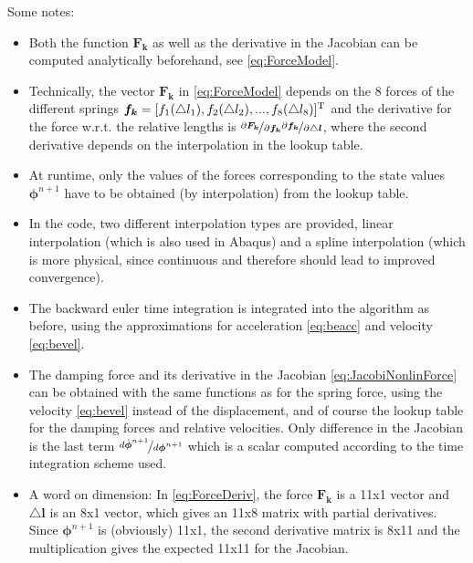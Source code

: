 Some notes:
\begin{itemize}
	\item Both the function $\boldsymbol{F_k}$ as well as the derivative in the Jacobian can be computed analytically beforehand, see \eqref{eq:ForceModel}.
	\item Technically, the vector $\boldsymbol{F_k}$ in \eqref{eq:ForceModel} depends on the 8 forces of the different springs  $\boldsymbol{f_k} = [f_1(\triangle l_1),\\ f_2(\triangle l_2), ..., f_8(\triangle l_8)]^\mathrm{T}$ and the derivative for the force w.r.t. the relative lengths is $\nicefrac{\partial \boldsymbol{F_k}}{\partial \boldsymbol{f_k}}\nicefrac{\partial \boldsymbol{f_k}}{\partial \triangle\boldsymbol{l}}$, where the second derivative depends on the interpolation in the lookup table. 
	\item At runtime, only the values of the forces corresponding to the state values $\boldsymbol{\phi}^{n+1}$ have to be obtained (by interpolation) from the lookup table.
	\item In the code, two different interpolation types are provided, linear interpolation (which is also used in Abaqus) and a spline interpolation (which is more physical, since continuous and therefore should lead to improved convergence).  
	\item The backward euler time integration is integrated into the algorithm as before, using the approximations for acceleration \eqref{eq:beacc} and velocity \eqref{eq:bevel}.
	\item The damping force and its derivative in the Jacobian \eqref{eq:JacobiNonlinForce} can be obtained with the same functions as for the spring force, using the velocity \eqref{eq:bevel} instead of the displacement, and of course the lookup table for the damping forces and relative velocities. Only difference in the Jacobian is the last term $\nicefrac{d \dot{\boldsymbol{\phi}}^{n+1}}{d \boldsymbol{\phi}^{n+1}}$ which is a scalar computed according to the time integration scheme used.
	\item A word on dimension: In \eqref{eq:ForceDeriv}, the force $\boldsymbol{F_k}$ is a 11x1 vector and $\triangle\boldsymbol{l}$ is an 8x1 vector, which gives an 11x8 matrix with partial derivatives. Since $\boldsymbol{\phi}^{n+1}$ is (obviously) 11x1, the second derivative matrix is 8x11 and the multiplication gives the expected 11x11 for the Jacobian.
\end{itemize}


